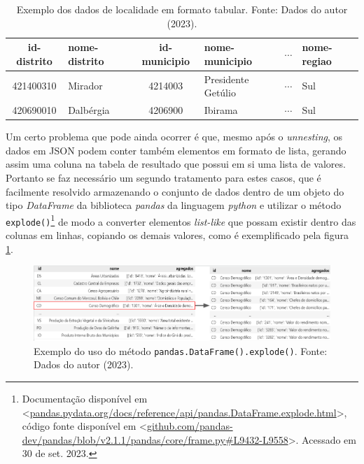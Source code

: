 \begin{center}
    \begin{table}[ht]
        \begin{tabular}{c l c l c l}
            \hline
                id-distrito & nome-distrito & id-municipio & nome-municipio & $\dotsi$ & nome-regiao\\
            \hline
                421400310 & Mirador & 4214003 & Presidente Getúlio & $\dotsi$ & Sul\\
                420690010 & Dalbérgia & 4206900 & Ibirama & $\dotsi$ & Sul\\     
            \hline
        \end{tabular}
        \caption{Exemplo dos dados de localidade em formato tabular. Fonte: Dados do autor (2023).}
        \label{tab:exemplo-api-localidades}
    \end{table}
\end{center}

    Um certo problema que pode ainda ocorrer é que, mesmo após o \textit{unnesting}, os dados em JSON podem conter também elementos em formato de lista, gerando assim uma coluna na tabela de resultado que possui em si uma lista de valores. Portanto se faz necessário um segundo tratamento para estes casos, que é facilmente resolvido armazenando o conjunto de dados dentro de um objeto do tipo \textit{DataFrame} da biblioteca \textit{pandas} da linguagem \textit{python} e utilizar o método \lstinline{explode()}\footnote{Documentação disponível em <\url{pandas.pydata.org/docs/reference/api/pandas.DataFrame.explode.html}>, código fonte disponível em <\url{github.com/pandas-dev/pandas/blob/v2.1.1/pandas/core/frame.py\#L9432-L9558}>. Acessado em 30 de set. 2023.}     de modo a converter elementos \textit{list-like} que possam existir dentro das colunas em linhas, copiando os demais valores, como é exemplificado pela figura \ref{fig:exploding-df}.

\begin{figure}[ht]
    \centering
    \includegraphics[width=\textwidth]{files/img/exploding_table.png}    \caption{Exemplo do uso do método \lstinline{pandas.DataFrame().explode()}. Fonte: Dados do autor (2023).}
    \label{fig:exploding-df}
\end{figure}

